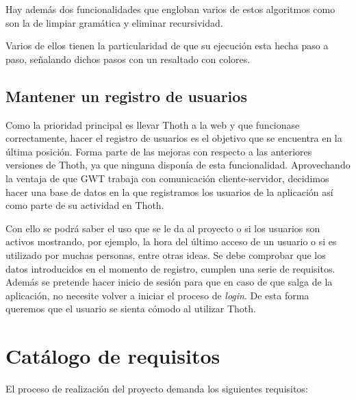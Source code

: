 Hay además dos funcionalidades que engloban varios de estos algoritmos como son la de limpiar gramática y eliminar recursividad.

Varios de ellos tienen la particularidad de que su ejecución esta hecha paso a paso, señalando dichos pasos con un resaltado con colores.

\subsection{Mantener un registro de usuarios}

Como la prioridad principal es llevar Thoth a la web y que funcionase correctamente, hacer el registro de usuarios es el objetivo que se encuentra en la última posición. Forma parte de las mejoras con respecto a las anteriores versiones de Thoth, ya que ninguna disponía de esta funcionalidad. Aprovechando la ventaja de que GWT trabaja con comunicación cliente-servidor, decidimos hacer una base de datos en la que registramos los usuarios de la aplicación así como parte de su actividad en Thoth.

Con ello se podrá saber el uso que se le da al proyecto o si los usuarios son activos mostrando, por ejemplo, la hora del último acceso de un usuario o si es utilizado por muchas personas, entre otras ideas. Se debe comprobar que los datos introducidos en el momento de registro, cumplen una serie de requisitos. Además se pretende hacer inicio de sesión para que en caso de que salga de la aplicación, no necesite volver a iniciar el proceso de \emph{login}. De esta forma queremos que el usuario se sienta cómodo al utilizar Thoth.
\section{Catálogo de requisitos}

El proceso de realización del proyecto demanda los siguientes requisitos:


